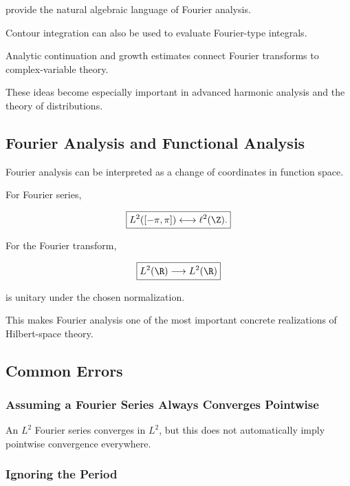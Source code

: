 provide the natural algebraic language of Fourier analysis.

Contour integration can also be used to evaluate Fourier-type integrals.

Analytic continuation and growth estimates connect Fourier transforms to
complex-variable theory.

These ideas become especially important in advanced harmonic analysis and
the theory of distributions.

\subsection{Fourier Analysis and Functional Analysis}
\label{subsec:fourier-functional-analysis}

Fourier analysis can be interpreted as a change of coordinates in
function space.

For Fourier series,

\[
\boxed{
L^2([-\pi,\pi])
\longleftrightarrow
\ell^2(\Z).
}
\]

For the Fourier transform,

\[
\boxed{
L^2(\R)
\longrightarrow
L^2(\R)
}
\]

is unitary under the chosen normalization.

This makes Fourier analysis one of the most important concrete
realizations of Hilbert-space theory.

\subsection{Common Errors}
\label{subsec:fourier-analysis-common-errors}

\subsubsection{Assuming a Fourier Series Always Converges Pointwise}

An \(L^2\) Fourier series converges in \(L^2\), but this does not
automatically imply pointwise convergence everywhere.

\subsubsection{Ignoring the Period}

